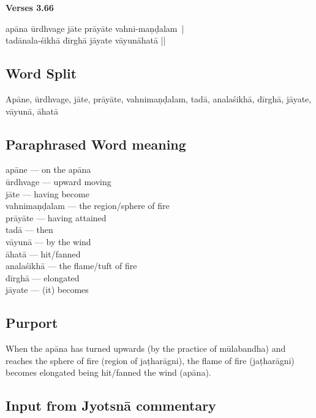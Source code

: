
\noindent \textbf{Verses 3.66}

\begin{shloka}
apāna ūrdhvage jāte prāyāte vahni-maṇḍalam |\\
tadānala-śikhā dīrghā jāyate vāyunāhatā ||
\end{shloka}

\subsection*{Word Split}

Apāne, ūrdhvage, jāte, prāyāte, vahnimaṇḍalam, tadā, analaśikhā, dīrghā, jāyate, vāyunā, āhatā

\subsection*{Paraphrased Word meaning}

\begin{multicols}{2}
apāne --- on the apāna \\
ūrdhvage --- upward moving  \\
jāte --- having become \\
vahnimaṇḍalam --- the region/sphere of fire \\
prāyāte --- having attained \\
tadā --- then  \\
vāyunā --- by the wind \\
āhatā --- hit/fanned \\
analaśikhā  --- the flame/tuft of fire \\
dīrghā --- elongated  \\
jāyate --- (it) becomes
\end{multicols}

\subsection*{Purport}

When the apāna has turned upwards (by the practice of mūlabandha) and reaches the sphere of fire (region of jaṭharāgni), the flame of fire (jaṭharāgni) becomes elongated being hit/fanned the wind (apāna). 

\subsection*{Input from Jyotsnā commentary}

